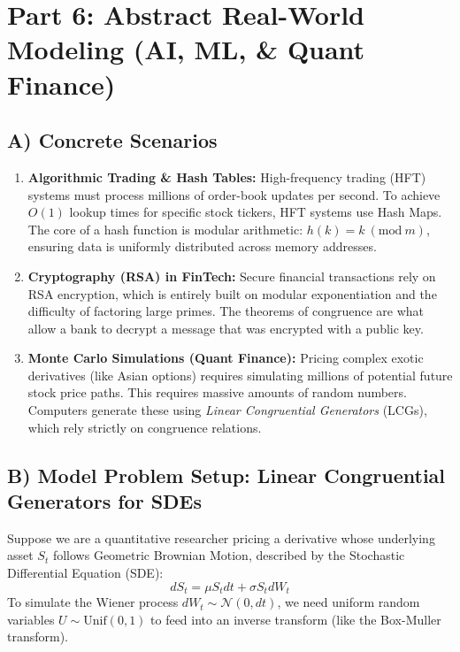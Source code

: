 \documentclass[11pt]{article}
\newcommand{\modulo}[1]{\ (\mathrm{mod}\ #1)}
\begin{document}
\section{Part 6: Abstract Real-World Modeling (AI, ML, \& Quant Finance)}

\subsection{A) Concrete Scenarios}
\begin{enumerate}
    \item \textbf{Algorithmic Trading \& Hash Tables:} High-frequency trading (HFT) systems must process millions of order-book updates per second. To achieve $O(1)$ lookup times for specific stock tickers, HFT systems use Hash Maps. The core of a hash function is modular arithmetic: $h(k) = k \modulo{m}$, ensuring data is uniformly distributed across memory addresses.
    \item \textbf{Cryptography (RSA) in FinTech:} Secure financial transactions rely on RSA encryption, which is entirely built on modular exponentiation and the difficulty of factoring large primes. The theorems of congruence are what allow a bank to decrypt a message that was encrypted with a public key.
    \item \textbf{Monte Carlo Simulations (Quant Finance):} Pricing complex exotic derivatives (like Asian options) requires simulating millions of potential future stock price paths. This requires massive amounts of random numbers. Computers generate these using \textit{Linear Congruential Generators} (LCGs), which rely strictly on congruence relations.
\end{enumerate}

\subsection{B) Model Problem Setup: Linear Congruential Generators for SDEs}
Suppose we are a quantitative researcher pricing a derivative whose underlying asset $S_t$ follows Geometric Brownian Motion, described by the Stochastic Differential Equation (SDE):
\[ dS_t = \mu S_t dt + \sigma S_t dW_t \]
To simulate the Wiener process $dW_t \sim \mathcal{N}(0, dt)$, we need uniform random variables $U \sim \text{Unif}(0,1)$ to feed into an inverse transform (like the Box-Muller transform). 
\end{document}
